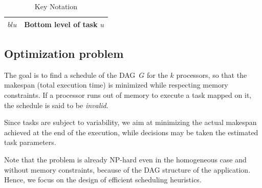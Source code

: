 \documentclass[conference]{IEEEtran}
\newcommand{\hmey}[1]{{\color{red}[HM: #1]}}
\begin{document}
\begin{table}
\begin{center}
\begin{tabular}{rl}
                $bl{u}$                      & Bottom level of task $u$ \\
                \hline
            \end{tabular}
        \end{center}
        \caption{Key Notation} \label{tabnotation}
    \end{table}



\subsection{Optimization problem}
\label{sec.mod.pb}

The goal is to find a schedule of the DAG~$G$ for the $k$ processors,
so that the makespan (total execution time) is minimized while
respecting memory constraints. If a processor runs out of memory to execute
a task mapped on it, the schedule is said to be {\em invalid}.

Since tasks are subject to variability, we aim at minimizing the actual makespan
achieved at the end of the execution, while decisions may be taken \wrt 
the estimated task parameters.

Note that the problem is already NP-hard even in the homogeneous case and 
without memory constraints, because of the DAG structure of the application. 
Hence, we focus on the design of efficient scheduling heuristics. 
\end{document}

